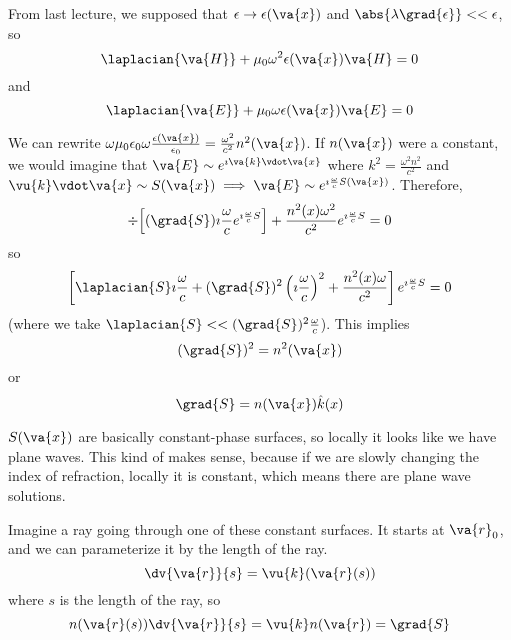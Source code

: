 \documentclass[a4paper,twoside,master.tex]{subfiles}
\begin{document}

From last lecture, we supposed that $ \epsilon \to \epsilon( \va{x}) $ and $ \abs{\lambda \grad{\epsilon}} << \epsilon $, so
\begin{equation}
    \laplacian{ \va{H}} + \mu_0 \omega^2 \epsilon( \va{x}) \va{H} = 0
\end{equation}
and
\begin{equation}
    \laplacian{ \va{E}} + \mu_0 \omega \epsilon( \va{x}) \va{E} = 0
\end{equation}

We can rewrite $ \omega \mu_0 \epsilon_0 \omega \frac{\epsilon( \va{x})}{\epsilon_0} = \frac{\omega^2}{c^2} n^2( \va{x}) $. If $ n( \va{x}) $ were a constant, we would imagine that $ \va{E} \sim e^{\imath \va{k} \vdot \va{x}} $ where $ k^2 = \frac{\omega^2 n^2}{c^2} $ and $ \vu{k} \vdot \va{x} \sim S( \va{x}) \implies \va{E} \sim e^{\imath \frac{\omega}{c} S( \va{x})} $.
Therefore,
\begin{equation}
    \div{\left[ (\grad{S}) \imath \frac{\omega}{c} e^{\imath \frac{\omega}{c} S} \right]} + \frac{n^2(x) \omega^2}{c^2} e^{\imath \frac{\omega}{c} S} = 0
\end{equation}
so
\begin{equation}
    \left[ \laplacian{S} \imath \frac{\omega}{c} + (\grad{S})^2 \left( \imath \frac{\omega}{c} \right)^2 + \frac{n^2(x) \omega}{c^2} \right] e^{\imath \frac{\omega}{c} S} = 0
\end{equation}
(where we take $ \laplacian{S} << (\grad{S})^2 \frac{\omega}{c} $). This implies
\begin{equation}
    (\grad{S})^2 = n^2( \va{x})
\end{equation}
or
\begin{equation}
    \grad{S} = n( \va{x}) \hat{k}(x)
\end{equation}

$ S( \va{x}) $ are basically constant-phase surfaces, so locally it looks like we have plane waves. This kind of makes sense, because if we are slowly changing the index of refraction, locally it is constant, which means there are plane wave solutions.

Imagine a ray going through one of these constant surfaces. It starts at $ \va{r}_0 $, and we can parameterize it by the length of the ray.
\begin{equation}
    \dv{ \va{r}}{s} = \vu{k}( \va{r}(s))
\end{equation}
where $ s $ is the length of the ray, so
\begin{equation}
    n( \va{r}(s)) \dv{ \va{r}}{s} = \vu{k} n( \va{r}) = \grad{S}
\end{equation}
\end{document}
